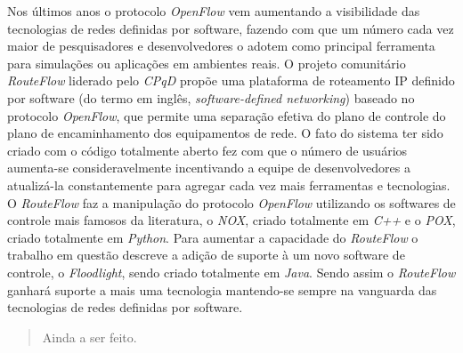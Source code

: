 \documentclass[dissertacao]{ppgccufscar}
\begin{document}
 

\capa
\folhaderosto
{}
\begin{folhadeaprovacao}
\end{folhadeaprovacao}

\begin{resumo}

Nos últimos anos o protocolo \textit{OpenFlow} vem aumentando a visibilidade das tecnologias de redes definidas por software, fazendo com que um número cada vez maior de pesquisadores e desenvolvedores o adotem como principal ferramenta para simulações ou aplicações em ambientes reais. O projeto comunitário \textit{RouteFlow} liderado pelo \textit{CPqD} propõe uma plataforma de roteamento IP definido por software (do termo em inglês, \textit{software-defined networking}) baseado no protocolo \textit{OpenFlow}, que permite uma separação efetiva do plano de controle do plano de encaminhamento dos equipamentos de rede. O fato do sistema ter sido criado com o código totalmente aberto fez com que o número de usuários aumenta-se consideravelmente incentivando a equipe de desenvolvedores a atualizá-la constantemente para agregar cada vez mais ferramentas e tecnologias. O \textit{RouteFlow} faz a manipulação do protocolo \textit{OpenFlow} utilizando os softwares de controle mais famosos da literatura, o \textit{NOX}, criado totalmente em \textit{C++} e o \textit{POX}, criado totalmente em \textit{Python}. Para aumentar a capacidade do \textit{RouteFlow} o trabalho em questão descreve a adição de suporte à um novo software de controle, o \textit{Floodlight}, sendo criado totalmente em \textit{Java}. Sendo assim o \textit{RouteFlow} ganhará suporte a mais uma tecnologia mantendo-se sempre na vanguarda das tecnologias de redes definidas por software.     

\end{resumo}

\begin{abstract}
Ainda a ser feito.

\end{abstract}

\listoffigures

\listofacronyms
\end{document}
